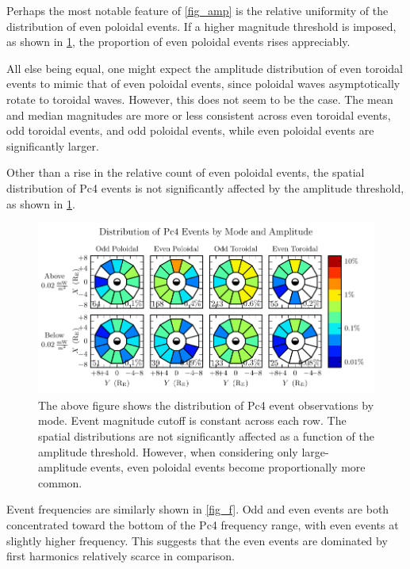 Perhaps the most notable feature of \cref{fig_amp} is the relative uniformity
of the distribution of even poloidal events. If a higher magnitude threshold is
imposed, as shown in \cref{fig_mode_amp}, the proportion of even poloidal
events rises appreciably. 

All else being equal, one might expect the amplitude distribution of even
toroidal events to mimic that of even poloidal events, since poloidal waves
asymptotically rotate to toroidal waves. However, this does not seem to be the
case. The mean and median magnitudes are more or less consistent across even
toroidal events, odd toroidal events, and odd poloidal events, while even
poloidal events are significantly larger. 

Other than a rise in the relative count of even poloidal events, the spatial
distribution of Pc4 events is not significantly affected by the amplitude
threshold, as shown in \cref{fig_mode_amp}. 

\begin{figure}[!htb]
  \centering
  \includegraphics[width=\textwidth]{figures/mode_amp.pdf}
  \caption[Rate of Pc4 Events by Mode and Amplitude]{
    The above figure shows the distribution of Pc4 event observations by mode.
    Event magnitude cutoff is constant across each row. The spatial
    distributions are not significantly affected as a function of the amplitude
    threshold.
    However, when considering only large-amplitude events, even poloidal events
    become proportionally more common. 
  }
  \label{fig_mode_amp}
\end{figure}

Event frequencies are similarly shown in \cref{fig_f}. Odd and even events are
both concentrated toward the bottom of the Pc4 frequency range, with even
events at slightly higher frequency. This suggests that the even events are
dominated by first harmonics relatively scarce in comparison. 


